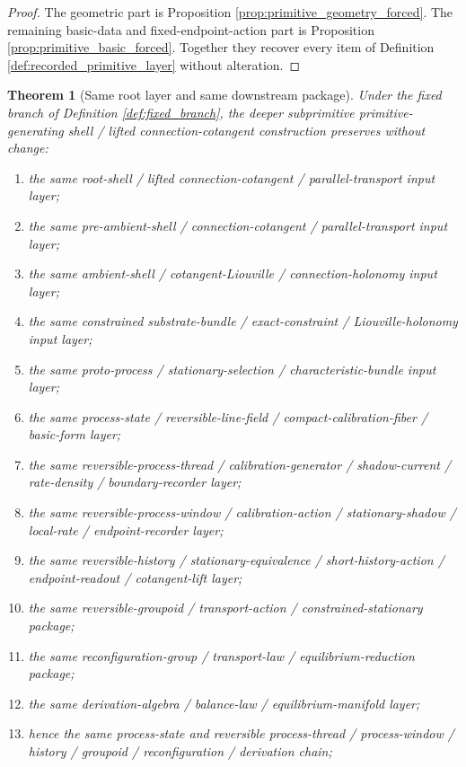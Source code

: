 \documentclass[11pt]{article}
\newtheorem{theorem}{Theorem}
\begin{document}
\begin{proof}
The geometric part is Proposition \ref{prop:primitive_geometry_forced}. The remaining basic-data and fixed-endpoint-action part is Proposition \ref{prop:primitive_basic_forced}. Together they recover every item of Definition \ref{def:recorded_primitive_layer} without alteration.
\end{proof}

\begin{theorem}[Same root layer and same downstream package]
\label{thm:same_package}
Under the fixed branch of Definition \ref{def:fixed_branch}, the deeper subprimitive primitive-generating shell / lifted connection-cotangent construction preserves without change:
\begin{enumerate}
    \item the same root-shell / lifted connection-cotangent / parallel-transport input layer;
    \item the same pre-ambient-shell / connection-cotangent / parallel-transport input layer;
    \item the same ambient-shell / cotangent-Liouville / connection-holonomy input layer;
    \item the same constrained substrate-bundle / exact-constraint / Liouville-holonomy input layer;
    \item the same proto-process / stationary-selection / characteristic-bundle input layer;
    \item the same process-state / reversible-line-field / compact-calibration-fiber / basic-form layer;
    \item the same reversible-process-thread / calibration-generator / shadow-current / rate-density / boundary-recorder layer;
    \item the same reversible-process-window / calibration-action / stationary-shadow / local-rate / endpoint-recorder layer;
    \item the same reversible-history / stationary-equivalence / short-history-action / endpoint-readout / cotangent-lift layer;
    \item the same reversible-groupoid / transport-action / constrained-stationary package;
    \item the same reconfiguration-group / transport-law / equilibrium-reduction package;
    \item the same derivation-algebra / balance-law / equilibrium-manifold layer;
    \item hence the same process-state and reversible process-thread / process-window / history / groupoid / reconfiguration / derivation chain;

\end{enumerate}
\end{theorem}
\end{document}
